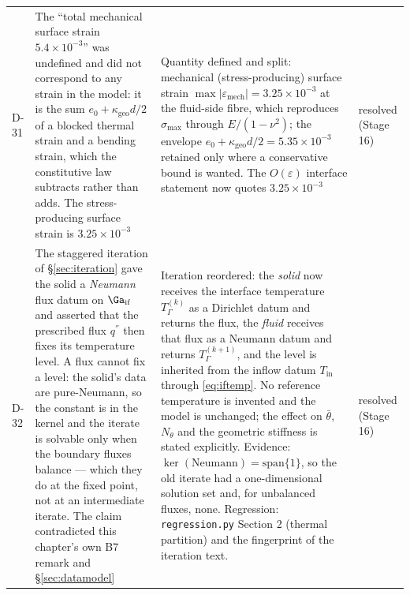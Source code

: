 \begin{longtable}{p{1cm}p{4.6cm}p{5.2cm}p{3.2cm}}
D-31 & The ``total mechanical surface strain $5.4\times10^{-3}$'' was undefined and did not correspond to any strain in the model: it is the sum $e_0+\kappa_{\mathrm{geo}}d/2$ of a blocked thermal strain and a bending strain, which the constitutive law subtracts rather than adds. The stress-producing surface strain is $3.25\times10^{-3}$ & Quantity defined and split: mechanical (stress-producing) surface strain $\max|\varepsilon_{\mathrm{mech}}|=3.25\times10^{-3}$ at the fluid-side fibre, which reproduces $\sigma_{\max}$ through $E/(1-\nu^2)$; the envelope $e_0+\kappa_{\mathrm{geo}}d/2=5.35\times10^{-3}$ retained only where a conservative bound is wanted. The $O(\varepsilon)$ interface statement now quotes $3.25\times10^{-3}$ & resolved (Stage 16) \\
D-32 & The staggered iteration of \S\ref{sec:iteration} gave the solid a \emph{Neumann} flux datum on $\Ga_{\mathrm{if}}$ and asserted that the prescribed flux $q^{''}$ then fixes its temperature level. A flux cannot fix a level: the solid's data are pure-Neumann, so the constant is in the kernel and the iterate is solvable only when the boundary fluxes balance --- which they do at the fixed point, not at an intermediate iterate. The claim contradicted this chapter's own B7 remark and \S\ref{sec:datamodel} & Iteration reordered: the \emph{solid} now receives the interface temperature $T_\Gamma^{(k)}$ as a Dirichlet datum and returns the flux, the \emph{fluid} receives that flux as a Neumann datum and returns $T_\Gamma^{(k+1)}$, and the level is inherited from the inflow datum $T_{\mathrm{in}}$ through \eqref{eq:iftemp}. No reference temperature is invented and the model is unchanged; the effect on $\bar\theta$, $N_\theta$ and the geometric stiffness is stated explicitly. Evidence: $\ker(\mathrm{Neumann})=\mathrm{span}\{1\}$, so the old iterate had a one-dimensional solution set and, for unbalanced fluxes, none. Regression: \texttt{regression.py} Section 2 (thermal partition) and the fingerprint of the iteration text. & resolved (Stage 16) \\

\end{longtable}
